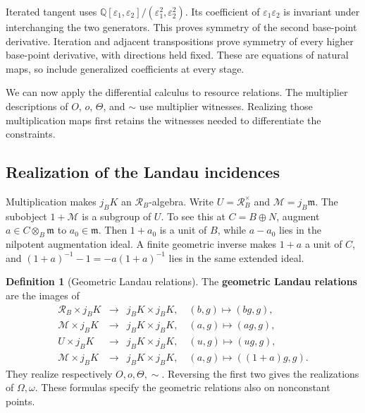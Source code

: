 \documentclass[11pt,a4paper]{article}
\numberwithin{algorithm}{section}
\numberwithin{equation}{section}
\theoremstyle{definition}
\newtheorem{definition}[definition]{Definition}
\theoremstyle{remark}
\theoremstyle{plain}
\newcommand{\QQ}{\mathbb Q}
\newcommand{\eps}{\varepsilon}
\newcommand{\Rline}{\mathcal R_B}
\theoremstyle{definition}
\theoremstyle{plain}
\begin{document}
Iterated tangent uses
$\QQ[\eps_1,\eps_2]/(\eps_1^2,\eps_2^2)$.
Its coefficient of $\eps_1\eps_2$ is invariant under
interchanging the two generators. This proves symmetry
of the second base-point derivative. Iteration and
adjacent transpositions prove symmetry of every higher
base-point derivative, with directions held fixed.
These are equations of natural maps, so include
generalized coefficients at every stage.

We can now apply the differential calculus to resource relations.
The multiplier descriptions of $O$, $o$, $\Theta$, and $\sim$ use
multiplier witnesses. Realizing those multiplication maps first
retains the witnesses needed to differentiate the constraints.

\subsection{Realization of the Landau incidences}
Multiplication makes $j_BK$ an $\Rline$-algebra.
Write $U=\Rline^\times$ and $\mathcal M=j_B\mathfrak m$.
The subobject $1+\mathcal M$ is a subgroup of $U$.
To see this at $C=B\oplus N$, augment
$a\in C\otimes_B\mathfrak m$ to $a_0\in\mathfrak m$.
Then $1+a_0$ is a unit of $B$, while $a-a_0$ lies in the
nilpotent augmentation ideal. A finite geometric inverse
makes $1+a$ a unit of $C$, and
$(1+a)^{-1}-1=-a(1+a)^{-1}$ lies in the same extended ideal.


\begin{definition}[Geometric Landau relations]\label{def:geometric-landau}
The \textbf{geometric Landau relations} are the images of
\[
\begin{array}{rcl}
 \Rline\times j_BK&\longrightarrow&j_BK\times j_BK,
       \quad (b,g)\longmapsto(bg,g),\\
 \mathcal M\times j_BK&\longrightarrow&j_BK\times j_BK,
       \quad (a,g)\longmapsto(ag,g),\\
 U\times j_BK&\longrightarrow&j_BK\times j_BK,
       \quad (u,g)\longmapsto(ug,g),\\
 \mathcal M\times j_BK&\longrightarrow&j_BK\times j_BK,
       \quad (a,g)\longmapsto((1+a)g,g).
\end{array}
\]
They realize respectively $O,o,\Theta,\sim$.
Reversing the first two gives the realizations of
$\Omega,\omega$. These formulas specify the geometric
relations also on nonconstant points.
\end{definition}
\end{document}
